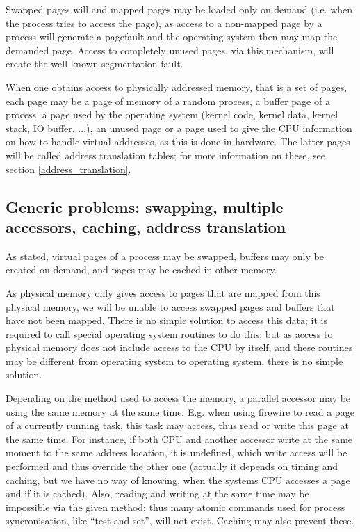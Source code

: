 Swapped pages will and mapped pages may be loaded only on demand (i.e. when the
process tries to access the page), as access to a non-mapped page by a process
will generate a pagefault and the operating system then may map the demanded
page.  Access to completely unused pages, via this mechanism, will create the
well known segmentation fault.

When one obtains access to physically addressed memory, that is a set of pages,
each page may be a page of memory of a random process, a buffer page of a
process, a page used by the operating system (kernel code, kernel data, kernel
stack, IO buffer, ...), an unused page or a page used to give the CPU
information on how to handle virtual addresses, as this is done in hardware.
The latter pages will be called address translation tables; for more information
on these, see section \ref{address_translation}.

\subsection{Generic problems: swapping, multiple accessors, caching, address
translation}

As stated, virtual pages of a process may be swapped, buffers may only be
created on demand, and pages may be cached in other memory.

As physical memory only gives access to pages that are mapped from this
physical memory, we will be unable to access swapped pages and buffers that
have not been mapped. There is no simple solution to access this data; it is
required to call special operating system routines to do this; but as access to
physical memory does not include access to the CPU by itself, and these
routines may be different from operating system to operating system, there is
no simple solution.

Depending on the method used to access the memory, a parallel accessor may be
using the same memory at the same time. E.g. when using firewire to read a page
of a currently running task, this task may access, thus read or write this page
at the same time. For instance, if both CPU and another accessor write at the
same moment to the same address location, it is undefined, which write access
will be performed and thus override the other one (actually it depends on timing
and caching, but we have no way of knowing, when the systems CPU accesses a page
and if it is cached). Also, reading and writing at the same time may be
impossible via the given method; thus many atomic commands used for process
syncronisation, like ``test and set'', will not exist.  Caching may also prevent
these.

